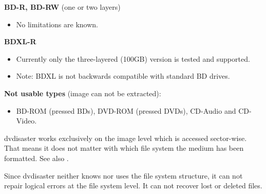 {\medskip

{\bf BD-R, BD-RW} \quad (one or two layers)

\begin{itemize}
\item No limitations are known.
\end{itemize}

\medskip

{\bf BDXL-R}

\begin{itemize}
\item Currently only the three-layered (100GB) version is tested and supported.
\item Note: BDXL is not backwards compatible with standard BD drives.
\end{itemize}

\medskip

{\bf Not usable types} (image can not be extracted):

\begin{itemize}
\item BD-ROM (pressed BDs), DVD-ROM (pressed DVDs), CD-Audio and CD-Video.
\end{itemize}}

   {dvdisaster works exclusively on the image level which is accessed
     sector-wise. That means it does not matter with which file system
     the medium has been formatted. See also .

     \smallskip
     
     Since dvdisaster neither knows nor uses the file system structure,
     it can not repair logical errors at the file system level. It can not
     recover lost or deleted files. }

